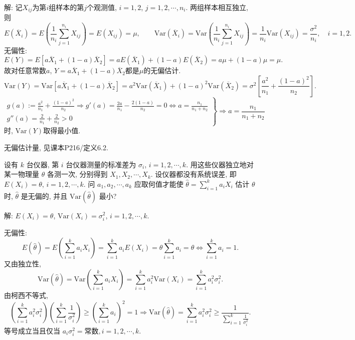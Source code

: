 \documentclass[standard]{ExBook}
\renewenvironment{shaded}{%
  \def\FrameCommand{\fboxsep=\FrameSep \colorbox{shadecolor}}%
  \MakeFramed{\advance\hsize-\width \FrameRestore}%
}{%
  \endMakeFramed
}
\begin{document}
\begin{qitems}
解: 记$X_{ij}$为第$i$组样本的第$j$个观测值, $i=1,2$, $j=1,2,\cdots,n_i$. 两组样本相互独立, 则
$$
E(\overline{X}_i)=E\left(\frac{1}{n_i}\sum_{j=1}^{n_i}X_{ij}\right)=E(X_{ij})=\mu,\qquad
\mathrm{Var}(\overline{X}_i)=\mathrm{Var}\left(\frac{1}{n_i}\sum_{j=1}^{n_i}X_{ij}\right)=\frac{1}{n_i}\mathrm{Var}(X_{ij})=\frac{\sigma^2}{n_i},\quad i=1,2.
$$
无偏性:
$$
E(Y)
=E[a\overline{X}_1+(1-a)\overline{X}_2]
=aE(\overline{X}_1)+(1-a)E(\overline{X}_2)
=a\mu+(1-a)\mu
=\mu.
$$
故对任意常数$a$, $Y=a\overline{X}_1+(1-a)\overline{X}_2$都是$\mu$的无偏估计.
$$
\mathrm{Var}(Y)
=\mathrm{Var}[a\overline{X}_1+(1-a)\overline{X}_2]
=a^2\mathrm{Var}(\overline{X}_1)+(1-a)^2\mathrm{Var}(\overline{X}_2)
=\sigma^2\left[\frac{a^2}{n_1}+\frac{(1-a)^2}{n_2}\right].
$$
$$
\left.
\begin{array}{r}
g(a):=\displaystyle\frac{a^2}{n_1}+\frac{(1-a)^2}{n_2}
\Longrightarrow
g'(a)=\frac{2a}{n_1}-\frac{2(1-a)}{n_2}=0
\Longleftrightarrow
a=\frac{n_1}{n_1+n_2}\\
g''(a)=\displaystyle\frac{2}{n_1}+\frac{2}{n_2}>0
\end{array}
\right\}
\Longrightarrow
a=\frac{n_1}{n_1+n_2}
$$
时, $\mathrm{Var}(Y)$取得最小值.

\textcolor{themeColor}{\selectfont {} 无偏估计量, 见课本P216/定义6.2.}

\vspace{2.5cm-5em}

    \begin{bbox}
    \begin{shaded}
        \qitem
设有 \(k\) 台仪器, 第 \(i\) 台仪器测量的标准差为 \(\sigma_i\), \(i = 1, 2, \cdots, k\). 用这些仪器独立地对某一物理量 \(\theta\) 各测一次, 分别得到 \(X_1, X_2, \cdots, X_k\). 设仪器都没有系统误差, 即 \(E(X_i) = \theta\), \(i = 1, 2, \cdots, k\). 问 \(a_1, a_2, \cdots, a_k\) 应取何值才能使 \(\hat{\theta} = \displaystyle\sum\limits_{i=1}^k a_i X_i\) 估计 \(\theta\) 时, \(\hat{\theta}\) 是无偏的, 并且 \(\text{Var}(\hat{\theta})\) 最小?
    \end{shaded}
    \end{bbox}

\vspace{\dimexpr2.5cm-5em\relax}

解: $E(X_i)=\theta$, $\mathrm{Var}(X_i)=\sigma_i^2$, $i=1,2,\cdots,k$.

无偏性:
$$
E(\hat{\theta})
=E\left(\sum_{i=1}^{k}a_iX_i\right)
=\sum_{i=1}^{k}a_iE(X_i)
=\theta\sum_{i=1}^{k}a_i
=\theta
\Longleftrightarrow
\sum_{i=1}^{k}a_i=1.
$$
又由独立性,
$$
\mathrm{Var}(\hat{\theta})
=\mathrm{Var}\left(\sum_{i=1}^{k}a_iX_i\right)
=\sum_{i=1}^{k}a_i^2\mathrm{Var}(X_i)
=\sum_{i=1}^{k}a_i^2\sigma_i^2.
$$
由柯西不等式,
$$
\left(\sum_{i=1}^{k}a_i^2\sigma_i^2\right)
\left(\sum_{i=1}^{k}\frac{1}{\sigma_i^2}\right)
\geq
\left(\sum_{i=1}^{k}a_i\right)^2
=1
\Longrightarrow
\mathrm{Var}(\hat{\theta})
=\sum_{i=1}^{k}a_i^2\sigma_i^2
\geq
\frac{1}{\sum\limits_{i=1}^{k}\frac{1}{\sigma_i^2}}.
$$
等号成立当且仅当
$
a_i\sigma_i^2=\text{常数}, i=1,2,\cdots,k
$.


\end{qitems}
\end{document}
